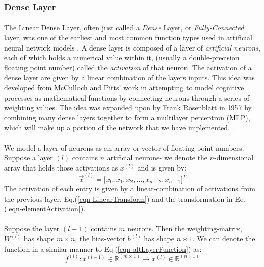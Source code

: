 \documentclass[12pt,letterpaper]{article}
\begin{document}

\subsubsection{Dense Layer}
\label{subsubsec-DenseLayer}

\paragraph*{}The Linear Dense Layer, often just called a \textit{Dense} Layer, or \textit{Fully-Connected} layer, was one of the earliest and most common function types used in artificial neural network models \cite{Geron2,Loy,McCulloch}. A dense layer is composed of a layer of \textit{artificial neurons}, each of which holds a numerical value within it, (usually a double-precision floating point number) called the \textit{activation} of that neuron. The activation of a dense layer are given by a linear combination of the layers inputs. This idea was developed from McCulloch and Pitts' work \cite{McCulloch} in attempting to model cognitive processes as mathematical functions by connecting neurons through a series of weighting values. The idea was expanded upon by Frank Rosenblatt in  1957 by combining many dense layers together to form a multilayer perceptron (MLP), which will make up a portion of the network that we have implemented. \cite{Geron,Loy,Levine}.

\paragraph*{}We model a layer of neurons as an array or vector of floating-point numbers. Suppose a layer $(l)$ contains $n$ artificial neurons- we denote the $n$-dimensional array that holds those activations as $x^{(l)}$ and is given by:
\begin{equation}
\label{layer-DenseNeurons}
\vec{x}^{(l)} = \Big[ x_0, x_1, x_2, \hdots , x_{n-2}, x_{n-1} \Big]^T
\end{equation}
The activation of each entry is given by a linear-combination of activations from the previous layer, Eq.(\ref{eqn-LinearTransform}) and the transformation in Eq.(\ref{eqn-elementActivation}).

\paragraph*{}Suppose the layer $(l-1)$ contains $m$ neurons. Then the weighting-matrix, $W^{(l)}$ has shape $m \times n$, the bias-vector $b^{(l)}$ has shape $n \times 1$. We can denote the function in a similar manner to Eq.(\ref{eqn-altLayerFunction}) as:
\begin{equation}
\label{eqn-FunctionDense}
f^{(l)} : x^{(l-1)} \in \mathbb{R}^{(m \times 1)} \rightarrow x^{(l)} \in \mathbb{R}^{(n \times 1)}
\end{equation}
\end{document}
